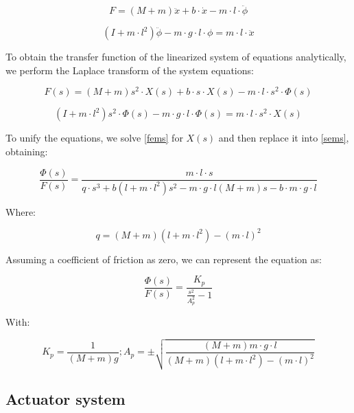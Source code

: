 \begin{equation} \label{feml}
	F=(M+m)\ddot{x}+b\cdot \dot{x}-m\cdot l\cdot \ddot{\phi}
\end{equation}

\begin{equation} \label{seml}
	(I+m\cdot l^2)\ddot{\phi}-m\cdot g\cdot l\cdot \phi=m\cdot l\cdot \ddot{x}
\end{equation}

To obtain the transfer function of the linearized system of equations analytically, we perform the Laplace transform of the system equations:

\begin{equation} \label{fems}
	F(s)=(M+m)s^2\cdot X(s)+b\cdot s\cdot X(s)-m\cdot l\cdot s^2\cdot \Phi(s)
\end{equation}

\begin{equation} \label{sems}
	(I+m\cdot l^2)s^2\cdot \Phi(s)-m\cdot g\cdot l\cdot \Phi(s)=m\cdot l\cdot s^2\cdot X(s)
\end{equation}

To unify the equations, we solve \ref{fems} for $X(s)$ and then replace it into \ref{sems}, obtaining:

\begin{equation} \label{ecms}
	\frac{\Phi(s)}{F(s)}=\frac{m\cdot l\cdot s}{q\cdot s^3+b(l+m\cdot l^2)s^2-m\cdot g\cdot l(M+m)s-b\cdot m\cdot g\cdot l}
\end{equation}

Where:

\begin{equation} \label{dq}
	q=(M+m)(l+m\cdot l^2)-(m\cdot l)^2
\end{equation}

Assuming a coefficient of friction as zero, we can represent the equation as:

\begin{equation} \label{efms}
	\frac{\Phi(s)}{F(s)}=\frac{K_p}{\frac{s^2}{A_p^2}-1}
\end{equation}

With:

\begin{equation} \label{dka}
	K_p=\frac{1}{(M+m)g} ; A_p=\pm \sqrt{\frac{(M+m)m\cdot g\cdot l}{(M+m)(l+m\cdot l^2)-(m\cdot l)^2}}
\end{equation}

\subsection{Actuator system}

